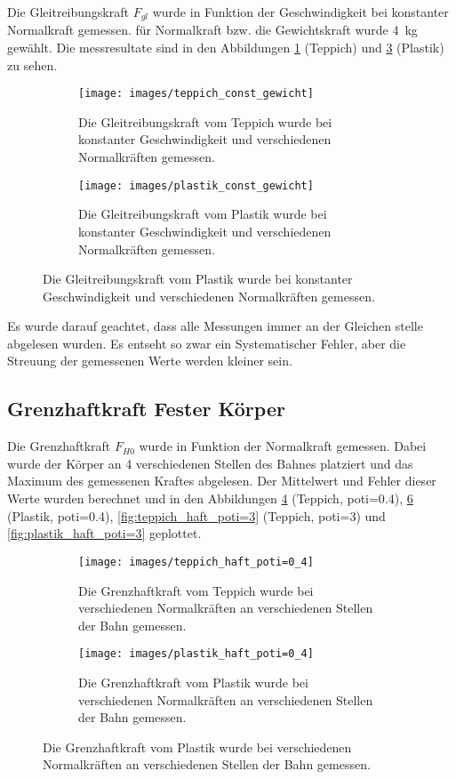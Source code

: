 Die  Gleitreibungskraft  $F_{gl}$  wurde  in Funktion  der  Geschwindigkeit  bei
konstanter Normalkraft gemessen. f\"ur Normalkraft bzw. die Gewichtskraft  wurde
\SI{4}{\kilo\gram}  gew\"ahlt.   Die   messresultate  sind  in  den  Abbildungen
\ref{fig:teppich_const_gewicht}  (Teppich)  und  \ref{fig:plastik_const_gewicht}
(Plastik) zu sehen.

\begin{figure}[H]
    \centering
    \begin{subfigure}{.7\textwidth}
        \texttt{[image: images/teppich\_const\_gewicht]}
        \caption{Die Gleitreibungskraft vom Teppich wurde bei konstanter Geschwindigkeit und verschiedenen Normalkr\"aften gemessen.}
        \label{fig:teppich_const_gewicht}
    \end{subfigure}
    \begin{subfigure}{.7\textwidth}
        \texttt{[image: images/plastik\_const\_gewicht]}
        \caption{Die Gleitreibungskraft vom Plastik wurde bei konstanter Geschwindigkeit und verschiedenen Normalkr\"aften gemessen.}
        \label{fig:plastik_const_gewicht}
    \end{subfigure}
\end{figure}

Es wurde darauf geachtet, dass  alle  Messungen  immer  an  der  Gleichen stelle
abgelesen  wurden.  Es  entseht  so zwar ein  Systematischer  Fehler,  aber  die
Streuung der gemessenen Werte werden kleiner sein.


\subsection{Grenzhaftkraft Fester K\"orper}

Die Grenzhaftkraft $F_{H0}$ wurde  in  Funktion  der Normalkraft gemessen. Dabei
wurde  der  K\"orper  an  4 verschiedenen Stellen des Bahnes platziert  und  das
Maximum des gemessenen Kraftes abgelesen. Der Mittelwert und Fehler dieser Werte
wurden  berechnet  und  in   den   Abbildungen   \ref{fig:teppich_haft_poti=0.4}
(Teppich,   poti=0.4),  \ref{fig:plastik_haft_poti=0.4}   (Plastik,   poti=0.4),
\ref{fig:teppich_haft_poti=3}           (Teppich,          poti=3)           und
\ref{fig:plastik_haft_poti=3} geplottet.

\begin{figure}[H]
    \centering
    \begin{subfigure}{.7\textwidth}
        \texttt{[image: images/teppich\_haft\_poti=0\_4]}
        \caption{Die Grenzhaftkraft vom Teppich wurde bei verschiedenen Normalkr\"aften an verschiedenen Stellen der Bahn gemessen.}
        \label{fig:teppich_haft_poti=0.4}
    \end{subfigure}
    \begin{subfigure}{.7\textwidth}
        \texttt{[image: images/plastik\_haft\_poti=0\_4]}
        \caption{Die Grenzhaftkraft vom Plastik wurde bei verschiedenen Normalkr\"aften an verschiedenen Stellen der Bahn gemessen.}
        \label{fig:plastik_haft_poti=0.4}
    \end{subfigure}
\end{figure}

